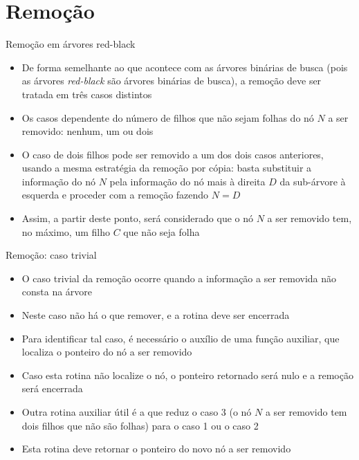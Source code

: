 \section{Remoção}

\begin{frame}[fragile]{Remoção em árvores red-black}

    \begin{itemize}
        \item De forma semelhante ao que acontece com as árvores binárias de busca (pois 
            as árvores \textit{red-black} são árvores binárias de busca), a remoção deve
            ser tratada em três casos distintos

        \item Os casos dependente do número de filhos que não sejam folhas do nó $N$ a ser
            removido: nenhum, um ou dois

        \item O caso de dois filhos pode ser removido a um dos dois casos anteriores, usando
            a mesma estratégia da remoção por cópia: basta substituir a informação do nó $N$
            pela informação do nó mais à direita $D$ da sub-árvore à esquerda e proceder com
            a remoção fazendo $N = D$

        \item Assim, a partir deste ponto, será considerado que o nó $N$ a ser removido tem,
            no máximo, um filho $C$ que não seja folha
    \end{itemize}

\end{frame}

\begin{frame}[fragile]{Remoção: caso trivial}

    \begin{itemize}
        \item O caso trivial da remoção ocorre quando a informação a ser removida não
            consta na árvore

        \item Neste caso não há o que remover, e a rotina deve ser encerrada

        \item Para identificar tal caso, é necessário o auxílio de uma função auxiliar, que
            localiza o ponteiro do nó a ser removido

        \item Caso esta rotina não localize o nó, o ponteiro retornado será nulo e a remoção
            será encerrada

        \item Outra rotina auxiliar útil é a que reduz o caso 3 (o nó $N$ a ser removido tem
            dois filhos que não são folhas) para o caso 1 ou o caso 2

        \item Esta rotina deve retornar o ponteiro do novo nó a ser removido
    \end{itemize}

\end{frame}

